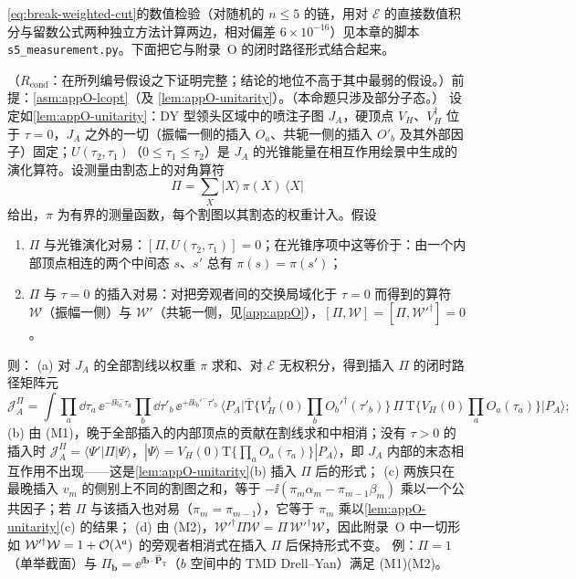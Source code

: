 \cref{eq:break-weighted-cut}的数值检验（对随机的 $n\le5$ 的链，用对 $\mathcal E$ 的直接数值积分与留数公式两种独立方法计算两边，相对偏差 $6\times10^{-16}$）见本章的脚本 \texttt{s5\_measurement.py}。下面把它与附录~O 的闭时路径形式结合起来。

\begin{proposition}\label{prop:break-measurement}
（$R_{\mathrm{cond}}$：在所列编号假设之下证明完整；结论的地位不高于其中最弱的假设。）前提：\cref{asm:appO-lcopt}（及 \cref{lem:appO-unitarity}）。（本命题只涉及部分子态。）
设定如\cref{lem:appO-unitarity}：DY 型领头区域中的喷注子图 $J_A$，硬顶点 $V_H$、$V_H^\dagger$ 位于 $\tau=0$，$J_A$ 之外的一切（振幅一侧的插入 $O_a$、共轭一侧的插入 $O'_b$ 及其外部因子）固定；$U(\tau_2,\tau_1)$（$0\le\tau_1\le\tau_2$）是 $J_A$ 的光锥能量在相互作用绘景中生成的演化算符。设测量由割态上的对角算符
\begin{equation}\label{eq:break-Pi}
\Pi=\sum_X|X\rangle\,\pi(X)\,\langle X|
\end{equation}
给出，$\pi$ 为有界的测量函数，每个割图以其割态的权重计入。假设
\begin{enumerate}[label=(M\arabic*),leftmargin=2.8em,itemsep=1pt,topsep=2pt]
\item $\Pi$ 与光锥演化对易：$[\Pi,U(\tau_2,\tau_1)]=0$；在光锥序项中这等价于：由一个内部顶点相连的两个中间态 $s$、$s'$ 总有 $\pi(s)=\pi(s')$；
\item $\Pi$ 与 $\tau=0$ 的插入对易：对把旁观者间的交换局域化于 $\tau=0$ 而得到的算符 $\mathcal W$（振幅一侧）与 $\mathcal W'$（共轭一侧，见\cref{app:appO}），$[\Pi,\mathcal W]=[\Pi,\mathcal W'^\dagger]=0$。
\end{enumerate}
则：
(a) 对 $J_A$ 的全部割线以权重 $\pi$ 求和、对 $\mathcal E$ 无权积分，得到插入 $\Pi$ 的闭时路径矩阵元
\begin{equation}\label{eq:break-ctp-Pi}
\mathcal J_A^{\Pi}=\int\prod_a\dd\tau_a\,\ee^{-\ii k_a^-\tau_a}\prod_b\dd\tau'_b\,\ee^{+\ii k_b'^-\tau'_b}\,
\big\langle P_A\big|\bar{\mathrm T}\big\{V_H^\dagger(0)\textstyle\prod_bO_b'^\dagger(\tau'_b)\big\}\,\Pi\,\mathrm T\big\{V_H(0)\prod_aO_a(\tau_a)\big\}\big|P_A\big\rangle ;
\end{equation}
(b) 由 (M1)，晚于全部插入的内部顶点的贡献在割线求和中相消；没有 $\tau>0$ 的插入时 $\mathcal J_A^{\Pi}=\langle\Psi'|\Pi|\Psi\rangle$，$|\Psi\rangle=V_H(0)\mathrm T\{\prod_aO_a(\tau_a)\}|P_A\rangle$，即 $J_A$ 内部的末态相互作用不出现——这是\cref{lem:appO-unitarity}(b) 插入 $\Pi$ 后的形式；
(c) 两族只在最晚插入 $v_m$ 的侧别上不同的割图之和，等于 $-\ii(\pi_m\alpha_m-\pi_{m-1}\beta_m)$ 乘以一个公共因子；若 $\Pi$ 与该插入也对易（$\pi_m=\pi_{m-1}$），它等于 $\pi_m$ 乘以\cref{lem:appO-unitarity}(c) 的结果；
(d) 由 (M2)，$\mathcal W'^\dagger\Pi\mathcal W=\Pi\,\mathcal W'^\dagger\mathcal W$，因此附录~O 中一切形如 $\mathcal W'^\dagger\mathcal W=1+\mathcal{O}\!\left(\lambda^a\right)$ 的旁观者相消式在插入 $\Pi$ 后保持形式不变。
例：$\Pi=1$（单举截面）与 $\Pi_{\boldsymbol b}=\ee^{\ii\boldsymbol b\cdot\hat{\boldsymbol P}_{\mathrm T}}$（$b$ 空间中的 TMD Drell--Yan）满足 (M1)(M2)。
\end{proposition}

